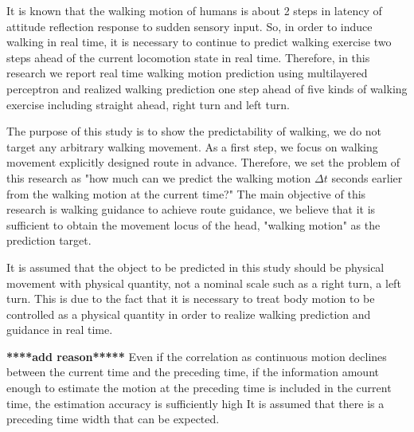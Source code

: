 \documentclass{sigchi}
\begin{document}
It is known that the walking motion of humans is about 2 steps in latency of attitude reflection response to sudden sensory input\cite{bib01}.
So, in order to induce walking in real time, it is necessary to continue to predict walking exercise two steps ahead of the current locomotion state in real time.
Therefore, in this research we report real time walking motion prediction using multilayered perceptron and realized walking prediction one step ahead of five kinds of walking exercise including straight ahead, right turn and left turn.

The purpose of this study is to show the predictability of walking, we do not target any arbitrary walking movement. As a first step, we focus on walking movement explicitly designed route in advance. Therefore, we set the problem of this research as "how much can we predict the walking motion $\Delta t$ seconds earlier from the walking motion at the current time?" The main objective of this research is walking guidance to achieve route guidance, we believe that it is sufficient to obtain the movement locus of the head, "walking motion" as the prediction target.

It is assumed that the object to be predicted in this study should be physical movement with physical quantity, not a nominal scale such as a right turn, a left turn. This is due to the fact that it is necessary to treat body motion to be controlled as a physical quantity in order to realize walking prediction and guidance in real time. 

{\bf  *****add reason*****} Even if the correlation as continuous motion declines between the current time and the preceding time, if the information amount enough to estimate the motion at the preceding time is included in the current time, the estimation accuracy is sufficiently high It is assumed that there is a preceding time width that can be expected.
\end{document}
